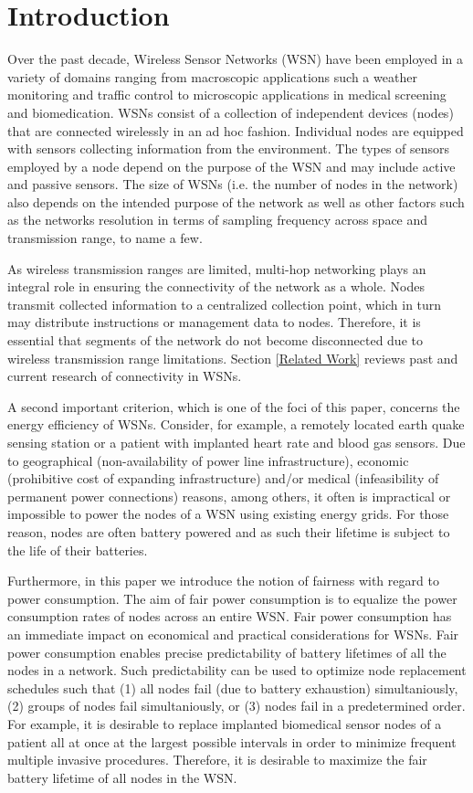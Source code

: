 \section{Introduction}

Over the past decade, Wireless Sensor Networks (WSN) have been employed in a variety of domains ranging from macroscopic applications such a weather monitoring and traffic control to microscopic applications in medical screening and biomedication. WSNs consist of a collection of independent devices (nodes) that are connected wirelessly in an ad hoc fashion. Individual nodes are equipped with sensors collecting information from the environment. The types of sensors employed by a node depend on the purpose of the WSN and may include active and passive sensors. The size of WSNs (i.e. the number of nodes in the network) also depends on the intended purpose of the network as well as other factors such as the networks resolution in terms of sampling frequency across space and transmission range, to name a few.

As wireless transmission ranges are limited, multi-hop networking plays an integral role in ensuring the connectivity of the network as a whole. Nodes transmit collected information to a centralized collection point, which in turn may distribute instructions or management data to nodes. Therefore, it is essential that segments of the network do not become disconnected due to wireless transmission range limitations. Section \ref{Related Work} reviews past and current research of connectivity in WSNs.

A second important criterion, which is one of the foci of this paper, concerns the energy efficiency of WSNs. Consider, for example, a remotely located earth quake sensing station or a patient with implanted heart rate and blood gas sensors. Due to geographical (non-availability of power line infrastructure), economic (prohibitive cost of expanding infrastructure) and/or medical (infeasibility of permanent power connections) reasons, among others, it often is impractical or impossible to power the nodes of a WSN using existing energy grids. For those reason, nodes are often battery powered and as such their lifetime is subject to the life of their batteries.

Furthermore, in this paper we introduce the notion of fairness with regard to power consumption. The aim of fair power consumption is to equalize the power consumption rates of nodes across an entire WSN. Fair power consumption has an immediate impact on economical and practical considerations for WSNs. Fair power consumption enables precise predictability of battery lifetimes of all the nodes in a network. Such predictability can be used to optimize node replacement schedules such that (1) all nodes fail (due to battery exhaustion) simultaniously, (2) groups of nodes fail simultaniously, or (3) nodes fail in a predetermined order. For example, it is desirable to replace implanted biomedical sensor nodes of a patient all at once at the largest possible intervals in order to minimize frequent multiple invasive procedures. Therefore, it is desirable to maximize the fair battery lifetime of all nodes in the WSN.

